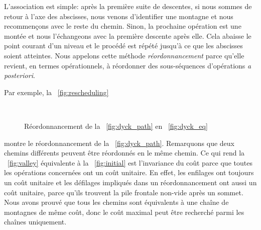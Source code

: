 L'association est simple: après la première suite de descentes, si
nous sommes de retour à l'axe des abscisses, nous venons d'identifier
une montagne et nous recommençons avec le reste du chemin. Sinon, la
prochaine opération est une montée et nous l'échangeons avec la
première descente après elle. Cela abaisse le point courant d'un
niveau et le procédé est répété jusqu'à ce que les abscisses soient
atteintes. Nous appelons cette méthode
\emph{réordonnancement} parce
qu'elle revient, en termes opérationnels, à réordonner des
sous-séquences d'opérations \emph{a posteriori}.

Par exemple, la \fig~\vref{fig:rescheduling}
\begin{figure}
\centering
{}
\qquad
{}\\
\qquad
{}
\caption{Réordonnancement de la \fig~\ref{fig:dyck_path} en  \fig~\ref{fig:dyck_eq}}
\label{fig:rescheduling}
\end{figure}
montre le réordonnancement de la \fig~\vref{fig:dyck_path}. Remarquons
que deux chemins différents peuvent être réordonnés en le même
chemin. Ce qui rend la \fig~\ref{fig:valley} équivalente à la
\fig~\ref{fig:initial} est l'invariance du coût parce que toutes les
opérations concernées ont un coût unitaire. En effet, les enfilages
ont toujours un coût unitaire et les défilages impliqués dans un
réordonnancement ont aussi un coût unitaire, parce qu'ils trouvent la
pile frontale non-vide après un sommet. Nous avons prouvé que tous les
chemins sont équivalents à une chaîne de montagnes de même coût, donc
le coût maximal peut être recherché parmi les chaînes uniquement.

